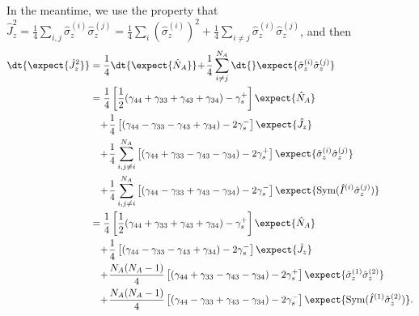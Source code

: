 In the meantime, we use the property that $ \hat{J}_z^2=\frac{1}{4} \sum_{i,j} \hat{\sigma}_z^{(i)}\hat{\sigma}_z^{(j)}=\frac{1}{4} \sum_{i} \left(\hat{\sigma}_z^{(i)}\right)^2 + \frac{1}{4} \sum_{i\neq j} \hat{\sigma}_z^{(i)}\hat{\sigma}_z^{(j)} $, and then 
\begin{align}
\dt{\expect{\hat{J}_z^2}} &=  \frac{1}{4}\dt{\expect{\hat{N}_A}} \!+\! \frac{1}{4}\sum_{i\neq j}^{N_A}\dt{}\expect{\hat{\sigma}_z^{(i)}\hat{\sigma}_z^{(j)}}\\
&= \frac{1}{4}\left[ \frac{1}{2} (\gamma_{44}+\gamma_{33}+\gamma_{43}+\gamma_{34})  -\gamma_s^+\right]\expect{\hat{N}_A} \nonumber\\
&\quad \!+\! \frac{1}{4} \left[  (\gamma_{44}-\gamma_{33}-\gamma_{43}+\gamma_{34})  -2\gamma_s^-\right] \expect{\hat{J}_z} \nonumber\\
&\quad \!+\! \frac{1}{4}\sum_{i,j\neq i}^{N_A} \left[ (\gamma_{44}+\gamma_{33}-\gamma_{43}-\gamma_{34})  -2\gamma_s^+\right]\expect{\hat{\sigma}_z^{(i)} \hat{\sigma}_z^{(j)}} \nonumber\\
&\quad \!+\! \frac{1}{4}\sum_{i,j\neq i}^{N_A} \left[ (\gamma_{44}-\gamma_{33}+\gamma_{43}-\gamma_{34})  -2\gamma_s^-\right]\expect{\mathrm{Sym}(\hat{I}^{(i)}\hat{\sigma}_z^{(j)} ) }\\
&= \frac{1}{4}\left[ \frac{1}{2} (\gamma_{44}+\gamma_{33}+\gamma_{43}+\gamma_{34})  -\gamma_s^+\right]\expect{\hat{N}_A} \nonumber\\
&\quad \!+\! \frac{1}{4} \left[  (\gamma_{44}-\gamma_{33}-\gamma_{43}+\gamma_{34})  -2\gamma_s^-\right] \expect{\hat{J}_z} \nonumber\\
&\quad \!+\! \frac{N_A(N_A-1)}{4} \left[ (\gamma_{44}+\gamma_{33}-\gamma_{43}-\gamma_{34})  -2\gamma_s^+\right]\expect{\hat{\sigma}_z^{(1)} \hat{\sigma}_z^{(2)}} \nonumber\\
&\quad \!+\! \frac{N_A(N_A-1)}{4} \left[ (\gamma_{44}-\gamma_{33}+\gamma_{43}-\gamma_{34})  -2\gamma_s^-\right]\expect{\mathrm{Sym}(\hat{I}^{(1)}\hat{\sigma}_z^{(2)} ) }.\label{eq:expJz2eq}
\end{align}

